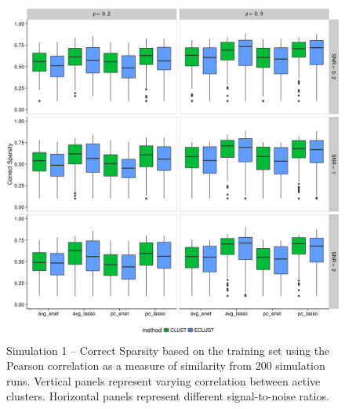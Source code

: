 \begin{figure}[H]
	\centering
	\includegraphics[scale=0.6, keepaspectratio]{./figs/hydra/results/figures/sim1-sept10/CorrectSparsity_Correlation_sim1.png}
	\caption{Simulation 1 -- Correct Sparsity based on the training set using the Pearson correlation as a measure of similarity from 200 simulation runs. Vertical panels represent varying correlation between active clusters. Horizontal panels represent different signal-to-noise ratios.}
	\label{fig:CorrectSparsity_Correlation_sim1}
\end{figure}


